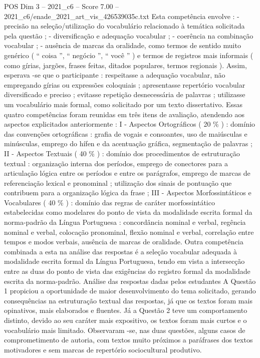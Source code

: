 \begin{textsample}{POS Dim 3 – 2021\_c6 – Score 7.00 – 2021\_c6/enade\_2021\_art\_vis\_426539035c.txt}
Esta competência envolve : - precisão na seleção/utilização do vocabulário relacionado à temática solicitada pela questão ; - diversificação e adequação vocabular ; - coerência na combinação vocabular ; - ausência de marcas da oralidade, como termos de sentido muito genérico ( “ coisa ”, “ negócio ”, “ você ” ) e termos de registros mais informais ( como gírias, jargões, frases feitas, ditados populares, termos regionais ).
Assim, esperava -se que o participante : respeitasse a adequação vocabular, não empregando gírias ou expressões coloquiais ; apresentasse repertório vocabular diversificado e preciso ; evitasse repetição desnecessária de palavras ; utilizasse um vocabulário mais formal, como solicitado por um texto dissertativo.
Essas quatro competências foram reunidas em três itens de avaliação, atendendo aos aspectos explicitados anteriormente : I - Aspectos Ortográficos ( 20 \% ) : domínio das convenções ortográficas : grafia de vogais e consoantes, uso de maiúsculas e minúsculas, emprego do hífen e da acentuação gráfica, segmentação de palavras ; II - Aspectos Textuais ( 40 \% ) : domínio dos procedimentos de estruturação textual : organização interna dos períodos, emprego de conectores para a articulação lógica entre os períodos e entre os parágrafos, emprego de marcas de referenciação lexical e pronominal ; utilização dos sinais de pontuação que contribuem para a organização lógica da frase ; III - Aspectos Morfossintáticos e Vocabulares ( 40 \% ) : domínio das regras de caráter morfossintático estabelecidas como modelares do ponto de vista da modalidade escrita formal da norma-padrão da Língua Portuguesa : concordância nominal e verbal, regência nominal e verbal, colocação pronominal, flexão nominal e verbal, correlação entre tempos e modos verbais, ausência de marcas de oralidade.
Outra competência combinada a esta na análise das respostas é a seleção vocabular adequada à modalidade escrita formal da Língua Portuguesa, tendo em vista a intersecção entre as duas do ponto de vista das exigências do registro formal da modalidade escrita da norma-padrão.
Análise das respostas dadas pelos estudantes A Questão 1 propiciou a oportunidade de maior desenvolvimento do tema solicitado, gerando consequências na estruturação textual das respostas, já que os textos foram mais opinativos, mais elaborados e fluentes.
Já a Questão 2 teve um comportamento distinto, devido ao seu caráter mais expositivo, os textos foram mais curtos e o vocabulário mais limitado.
Observaram -se, nas duas questões, alguns casos de comprometimento de autoria, com textos muito próximos a paráfrases dos textos motivadores e sem marcas de repertório sociocultural produtivo.

\end{textsample}
